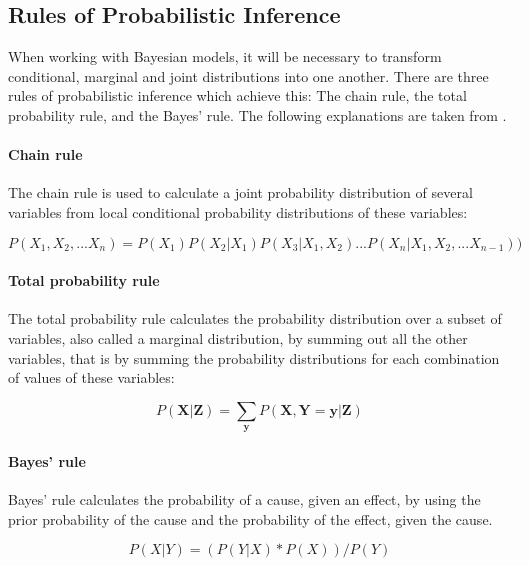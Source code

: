 \documentclass{article}
\begin{document}
\begin{appendices}
\section{Rules of Probabilistic Inference}
\label{appendix:Rules of Probabilistic Inference}

When working with Bayesian models, it will be necessary to transform conditional, marginal and joint distributions into one another. There are three rules of probabilistic inference which achieve this: The chain rule, the total probability rule, and the Bayes' rule. The following explanations are taken from \cite{9781617292330}.

\paragraph{Chain rule}

The chain rule is used to calculate a \gls{joint probability distribution} of several variables from local \gls{conditional probability distribution}s of these variables:

\begin{equation}
P(X_1 ,X_2 ,...X_n ) = P(X_1 )P(X_2 | X_1 )P(X_3 | X_1 ,X_2 )...P(X_n | X_1 ,X_2 ,...X_{n-1}) )
\end{equation}

\paragraph{Total probability rule}

The total probability rule calculates the probability distribution over a subset of variables, also called a \gls{marginal distribution}, by summing out all the other variables, that is by summing the probability distributions for each combination of values of these variables:

\begin{equation}
P(\boldsymbol X |\boldsymbol Z ) = \sum_{\boldsymbol y}   P(\boldsymbol X ,\boldsymbol Y =\boldsymbol y |\boldsymbol Z )
\end{equation} 

\paragraph{Bayes' rule}

Bayes' rule calculates the probability of a cause, given an effect, by using the prior probability of the cause and the probability of the effect, given the cause. 

\begin{equation}
P(X|Y) = ( P(Y|X) * P(X) ) / P(Y)
\end{equation}
\end{appendices}
	
\end{document}
